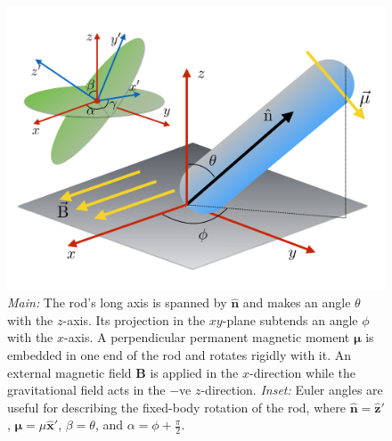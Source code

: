 \documentclass[aps,prl,twocolumn,superscriptaddress]{revtex4-1}
\newcommand{\vcrm}[1]{\mathbf{#1}}
\newcommand{\hvcrm}[1]{\mathbf{\hat{#1}}}
\newcommand{\vc}[1]{\boldsymbol{#1}}
\begin{document}
\begin{figure}
		\includegraphics[width=0.8\columnwidth]{figs/geometry.pdf}
	\caption{\footnotesize \emph{Main:} The rod's long axis is spanned by $\hvcrm{n}$ and makes an angle $\theta$ with the $z$-axis. Its projection in the $xy$-plane subtends an angle $\phi$ with the $x$-axis. A perpendicular permanent magnetic moment $\vc{\mu}$ is embedded in one end of the rod and rotates rigidly with it. An external magnetic field $\vcrm{B}$ is applied in the $x$-direction while the gravitational field acts in the $-$ve $z$-direction. \emph{Inset:} Euler angles are useful for describing the fixed-body rotation of the rod, where $\hvcrm{n}=\hvcrm{z}'$, $\vc{\mu}=\mu\hvcrm{x}'$, $\beta=\theta$, and $\alpha=\phi+\frac{\pi}{2}$.\label{fig:geometry}}
\end{figure}
\end{document}
